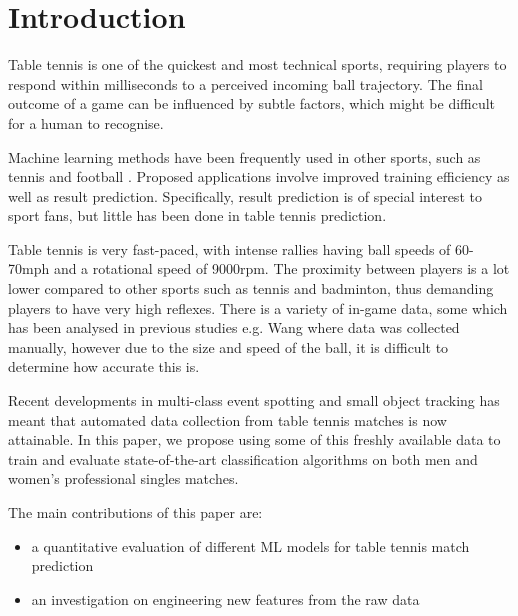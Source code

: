 \section{Introduction}
Table tennis is one of the quickest and most technical sports, requiring players to respond within milliseconds to a perceived incoming ball trajectory. The final outcome of a game can be influenced by subtle factors, which might be difficult for a human to recognise. 

Machine learning methods have been frequently used in other sports, such as tennis \cite{cornman2017machine} and football \cite{hucaljuk2011predicting}. Proposed applications involve improved training efficiency  as well as result prediction. Specifically, result prediction is of special interest to sport fans, but little has been done in table tennis prediction.

Table tennis is very fast-paced, with intense rallies having ball speeds of 60-70mph and a rotational speed of 9000rpm. The proximity between players is a lot lower compared to other sports such as tennis and badminton, thus demanding players to have very high reflexes.
There is a variety of in-game data, some which has been analysed in previous studies e.g. Wang \etal \cite{wang2019tac} where data was collected manually, however due to the size and speed of the ball, it is difficult to determine how accurate this is.

Recent developments in  multi-class event spotting and small object tracking has meant that automated data collection from table tennis matches is now attainable. 
In this paper, we propose using some of this freshly available data to train and evaluate  state-of-the-art classification algorithms on both men and women's professional singles matches. %

The main contributions of this paper are:
\begin{itemize}
    \item a quantitative evaluation of different ML models for table tennis match prediction
    \item  an investigation on engineering new features from the raw data
\end{itemize}

